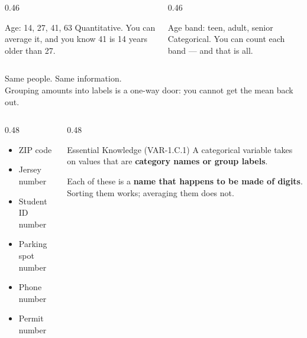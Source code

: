 \documentclass[aspectratio=169, 11pt]{beamer}
\begin{document}
\begin{frame}[t, plain]
  \vspace{6pt}
  \begin{columns}[t]
    \begin{column}{0.46\textwidth}
      \begin{block}{Age: 14, 27, 41, 63}
        Quantitative. You can average it, and you know 41 is 14 years older than 27.
      \end{block}
    \end{column}
    \begin{column}{0.46\textwidth}
      \begin{block}{Age band: teen, adult, senior}
        Categorical. You can count each band --- and that is all.
      \end{block}
    \end{column}
  \end{columns}
  \vspace{14pt}
  \begin{center}
    {\large Same people. Same information. }\\[8pt]
    {\small\color{slate} Grouping amounts into labels is a one-way door: you cannot
    get the mean back out.}
  \end{center}
\end{frame}

\begin{frame}[t, plain]
  \vspace{6pt}
  \begin{columns}[t]
    \begin{column}{0.48\textwidth}
      \begin{itemize}\setlength{\itemsep}{7pt}
        \item ZIP code
        \item Jersey number
        \item Student ID number
        \item Parking spot number
        \item Phone number
        \item Permit number
      \end{itemize}
    \end{column}
    \begin{column}{0.48\textwidth}
      \begin{block}{Essential Knowledge (VAR-1.C.1)}
        A categorical variable takes on values that are \textbf{category names or group
        labels}.
      \end{block}
      \vspace{6pt}
      {\small Each of these is a \textbf{name that happens to be made of digits}. Sorting
      them works; averaging them does not.}
    \end{column}
  \end{columns}
\end{frame}
\end{document}
